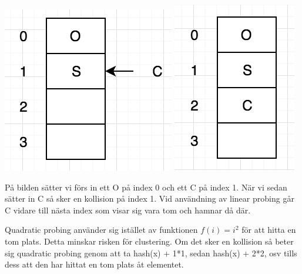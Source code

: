 \documentclass[a5paper,10pt,oneside]{article}
\begin{document}
 \includegraphics[scale=1]{prob1}
 \includegraphics[scale=1]{prob2}
 
 På bilden sätter vi förs in ett O på index 0 och ett C på index 1. När vi sedan sätter in C så sker en kollision på index 1. Vid användning av linear probing går C vidare till nästa index som visar sig vara tom och hamnar då där.

Quadratic probing använder sig istället av funktionen $f(i) = i^2$  för att hitta en tom plats. Detta minskar risken för clustering. Om det sker en kollision så beter sig quadratic probing genom att ta hash(x) + 1*1, sedan hash(x) + 2*2, osv tills dess att den har hittat en tom plats åt elementet. 
\end{document}
